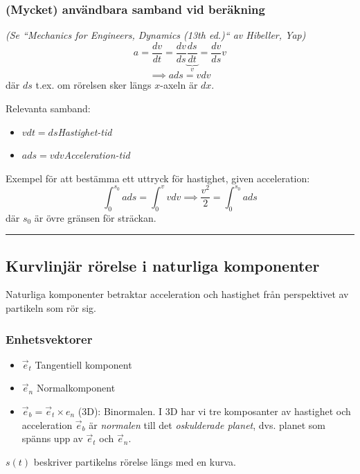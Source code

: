 \documentclass{article}
\newenvironment{ankiflashcard}[1]{}{}
\newcommand{\ruler}{
\rule{0.5\textwidth}{0.5pt}
}
\begin{document}
\begin{paracol}{2}
\switchcolumn

\begin{ankiflashcard}{Formulera en integral för att bestämma ett uttryck för hastighet utifrån acceleration.}
\subsubsection{(Mycket) användbara samband vid beräkning}
\textit{(Se ``Mechanics for Engineers, Dynamics (13th ed.)`` av Hibeller, Yap)}
$$
a=\frac{dv}{dt}=\frac{dv}{ds}\underbrace{\frac{ds}{dt}}_{v} = \frac{dv}{ds}v
$$
$$
\implies \boxed{a ds = v dv}
$$
där $ds$ t.ex. om rörelsen sker längs $x$-axeln är $dx$.
\end{ankiflashcard}
    
\begin{ankiflashcard}{Ange Hastighet-tid, Acceleration-tid och Hastighet-position samband.}
Relevanta samband:
\begin{itemize}
    \item $vdt = ds$\quad\textit{Hastighet-tid}
    \item $ads = vdv$\quad\textit{Acceleration-tid}
\end{itemize}
Exempel för att bestämma ett uttryck för hastighet, given acceleration:
$$\int_0^{s_0} a ds = \int_0^v v dv\implies \frac{v^2}{2} = \int_0^{s_0} a ds$$
där $s_0$ är övre gränsen för sträckan.
\end{ankiflashcard}

\ruler
\subsection{Kurvlinjär rörelse i naturliga komponenter}
Naturliga komponenter betraktar acceleration och hastighet från perspektivet av partikeln som rör sig.

\subsubsection{Enhetsvektorer}
\begin{itemize}
    \item $\vec e_t$ Tangentiell komponent
    \item  $\vec e_n$ Normalkomponent
    \item $\vec e_b=\vec e_t \times e_n$ (3D): Binormalen. I 3D har vi tre komposanter av hastighet och acceleration $\vec e_b$ är \textit{normalen} till det \textit{oskulderade planet}, dvs. planet som spänns upp av $\vec e_t$ och $\vec e_n$.
\end{itemize}
$s(t)$ beskriver partikelns rörelse längs med en kurva.


\end{paracol}
\end{document}
